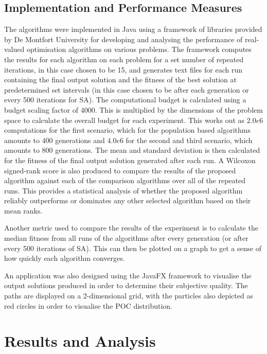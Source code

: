\documentclass[10pt,a4paper, oneside, conference]{IEEEtran}
\begin{document}
	\subsection{Implementation and Performance Measures}
	
	The algorithms were implemented in Java using a framework of libraries provided by De Montfort University for developing and analysing the performance of real-valued optimisation algorithms on various problems.
	The framework computes the results for each algorithm on each problem for a set number of repeated iterations, in this case chosen to be 15, and generates text files for each run containing the final output solution and the fitness of the best solution at predetermined set intervals (in this case chosen to be after each generation or every 500 iterations for SA).
	The computational budget is calculated using a budget scaling factor of $4000$. This is multiplied by the dimensions of the problem space to calculate the overall budget for each experiment. This works out as $2.0e6$ computations for the first scenario, which for the population based algorithms amounts to $400$ generations and $4.0e6$ for the second and third scenario, which amounts to $800$ generations.
	The mean and standard deviation is then calculated for the fitness of the final output solution generated after each run.
	A Wilcoxon signed-rank score is also produced to compare the results of the proposed algorithm against each of the comparison algorithms over all of the repeated runs.
	This provides a statistical analysis of whether the proposed algorithm reliably outperforms or dominates any other selected algorithm based on their mean ranks.
	
	Another metric used to compare the results of the experiment is to calculate the median fitness from all runs of the algorithms after every generation (or after every 500 iterations of SA).
	This can then be plotted on a graph to get a sense of how quickly each algorithm converges.
	
	An application was also designed using the JavaFX framework to visualise the output solutions produced in order to determine their subjective quality.
	The paths are displayed on a 2-dimensional grid, with the particles also depicted as red circles in order to visualise the POC distribution.
	
	\section{Results and Analysis}	
	\label{section:results}
\end{document}
